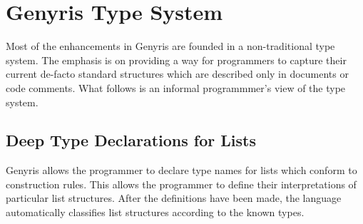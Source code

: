 \documentclass[a4paper,12pt,dvips]{article}
\begin{document}


\section{Genyris Type System}
Most of the enhancements in Genyris are founded in a non-traditional type system. The emphasis is on providing a way for programmers to capture their current de-facto standard structures which are described only in documents or code comments. What follows is an informal programmmer's view of the type system.

\subsection{Deep Type Declarations for Lists}
Genyris allows the programmer to declare type names for lists which conform to construction rules. This allows the programmer to define their interpretations of particular list structures. After the definitions have been made, the language automatically classifies list structures according to the known types.
\end{document}
